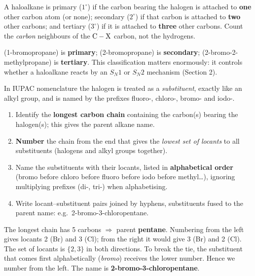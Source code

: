 \documentclass[11pt]{article}
\newcommand{\cle}[1]{{\popxbold\color{popdark}#1}}
\newcounter{popsec}
\newcounter{popsub}
\newcommand{\courssub}[1]{%
  \stepcounter{popsub}%
  \par\vspace{9pt}\noindent{\popxbold\fontsize{11.5}{13}\selectfont\color{popink}{\color{poporange}\thepopsec.\thepopsub}\hspace{6pt}#1}\par\nopagebreak\vspace{4pt}
}
\begin{document}
\begin{definition}
A haloalkane is \cle{primary} ($1^\circ$) if the carbon bearing the halogen is attached to \textbf{one} other carbon atom (or none); \cle{secondary} ($2^\circ$) if that carbon is attached to \textbf{two} other carbons; and \cle{tertiary} ($3^\circ$) if it is attached to \textbf{three} other carbons. Count the \emph{carbon} neighbours of the $\ce{C}-\ce{X}$ carbon, not the hydrogens.
\end{definition}

\begin{exemplebox}
 (1-bromopropane) is \textbf{primary};  (2-bromopropane) is \textbf{secondary};  (2-bromo-2-methylpropane) is \textbf{tertiary}. This classification matters enormously: it controls whether a haloalkane reacts by an $S_N1$ or $S_N2$ mechanism (Section 2).
\end{exemplebox}

\courssub{Nomenclature of Halogeno Compounds}

In IUPAC nomenclature the halogen is treated as a \emph{substituent}, exactly like an alkyl group, and is named by the prefixes \cle{fluoro-}, \cle{chloro-}, \cle{bromo-} and \cle{iodo-}.

\begin{methode}
\begin{enumerate}
\item Identify the \textbf{longest carbon chain} containing the carbon(s) bearing the halogen(s); this gives the parent alkane name.
\item \textbf{Number} the chain from the end that gives the \emph{lowest set of locants} to all substituents (halogens and alkyl groups together).
\item Name the substituents with their locants, listed in \textbf{alphabetical order} (bromo before chloro before fluoro before iodo before methyl\ldots), ignoring multiplying prefixes (di-, tri-) when alphabetising.
\item Write locant--substituent pairs joined by hyphens, substituents fused to the parent name: e.g.\ 2-bromo-3-chloropentane.
\end{enumerate}
\end{methode}

\begin{exemplebox}
The longest chain has 5 carbons $\Rightarrow$ parent \textbf{pentane}. Numbering from the left gives locants 2 (Br) and 3 (Cl); from the right it would give 3 (Br) and 2 (Cl). The set of locants is $\{2,3\}$ in both directions. To break the tie, the substituent that comes first alphabetically (\emph{bromo}) receives the lower number. Hence we number from the left. The name is \textbf{2-bromo-3-chloropentane}.
\end{exemplebox}
\end{document}
